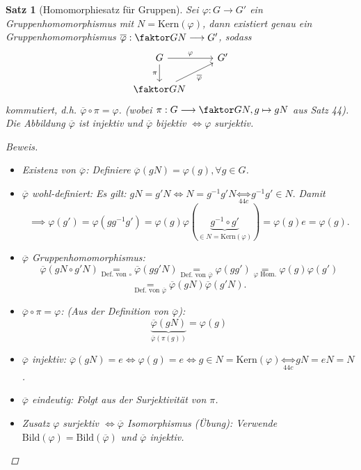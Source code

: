 \documentclass[a4paper]{report}
\theoremstyle{plain}
\newtheorem{satz}[thm]{Satz}
\theoremstyle{definition}
\begin{document}
\begin{satz}[Homomorphiesatz für Gruppen]
  Sei $\varphi: G \to G'$ ein Gruppenhomomorphismus mit $N = \mathrm{Kern}(\varphi)$, dann existiert genau ein Gruppenhomomorphismus $\overline \varphi : \faktor GN \longrightarrow G'$, sodass
  $$
\begin{tikzcd}
G \arrow[r, "\varphi"] \arrow[d, "\pi"'] & G' \\
\faktor GN \arrow[ru, "\overline \varphi"']               &
\end{tikzcd}
$$
kommutiert, d.h. $\overline \varphi \circ \pi = \varphi$. (wobei $\pi : G \longrightarrow \faktor GN, g \mapsto gN$ aus Satz 44). Die Abbildung $\overline \varphi$ ist injektiv und $\overline \varphi$ bijektiv $\iff \varphi$ surjektiv.
\begin{proof}[Beweis]
\begin{itemize}
  \item Existenz von $\overline \varphi$: Definiere $\overline\varphi(gN) = \varphi(g), \forall g \in G$.
  \item $\overline\varphi$ wohl-definiert: Es gilt: $gN = g'N \iff N = g^{-1}g'N \underset{44c}\iff g^{-1}g' \in N.$ Damit $$\implies \varphi(g') = \varphi(gg^{-1}g') = \varphi(g)\varphi(\underbrace{g^{-1} \circ g'}_{\in N = \mathrm{Kern}(\varphi)}) = \varphi(g)e = \varphi(g).$$
  \item $\overline\varphi$ Gruppenhomomorphismus: $$\overline\varphi(gN \circ g'N)\underset{\text{Def. von } \circ} = \overline\varphi(gg'N) \underset{\text{Def. von } \overline\varphi} =  \varphi(gg') \underset{\varphi \text{ Hom.}} = \varphi(g)\varphi(g')$$
        $$\underset{\text{Def. von } \overline\varphi} =\overline\varphi(gN)\overline\varphi(g'N).$$
\item $\overline\varphi \circ \pi = \varphi$: (Aus der Definition von $\overline\varphi$): $$\underbrace{\overline\varphi(gN)}_{\overline\varphi(\pi(g))} = \varphi(g)$$
\item $\overline\varphi$ injektiv: $\overline\varphi(gN) = e \iff \varphi(g)=e \iff g \in N = \mathrm{Kern}(\varphi) \underset{44c} \iff gN= eN = N$.
\item $\overline\varphi$ eindeutig: Folgt aus der Surjektivität von $\pi$.
\item Zusatz $\varphi$ surjektiv $\iff \overline\varphi$ Isomorphismus (Übung): Verwende $\mathrm{Bild}(\varphi) = \mathrm{Bild}(\overline\varphi)$ und $\overline\varphi$ injektiv.
\end{itemize}
\end{proof}
\end{satz}
\end{document}
